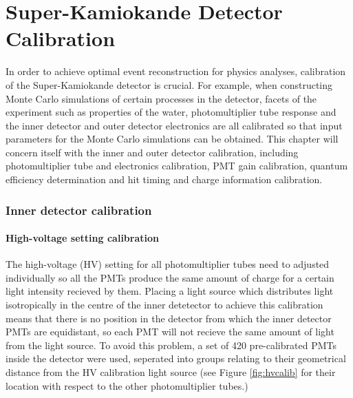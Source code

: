 \chapter{Super-Kamiokande Detector Calibration}
\label{chp:superkcalib}


In order to achieve optimal event reconstruction for physics analyses, calibration of the Super-Kamiokande detector is crucial. For example, when constructing Monte Carlo simulations of certain processes in the detector, facets of the experiment such as properties of the water, photomultiplier tube response and the inner detector and outer detector electronics are all calibrated so that input parameters for the Monte Carlo simulations can be obtained. This chapter will concern itself with the inner and outer detector calibration, including photomultiplier tube and electronics calibration, PMT gain calibration, quantum efficiency determination and hit timing and charge information calibration. 

\subsection{Inner detector calibration}


\subsubsection{High-voltage setting calibration}

The high-voltage (HV) setting for all photomultiplier tubes need to adjusted individually so all the PMTs produce the same amount of charge for a certain light intensity recieved by them. Placing a light source which distributes light isotropically in the centre of the inner detetector to achieve this calibration means that there is no position in the detector from which the inner detector PMTs are equidistant, so each PMT will not recieve the same amount of light from the light source. To avoid this problem, a set of 420 pre-calibrated PMTs inside the detector were used, seperated into groups relating to their geometrical distance from the HV calibration light source (see Figure \ref{fig:hvcalib} for their location with respect to the other photomultiplier tubes.)

